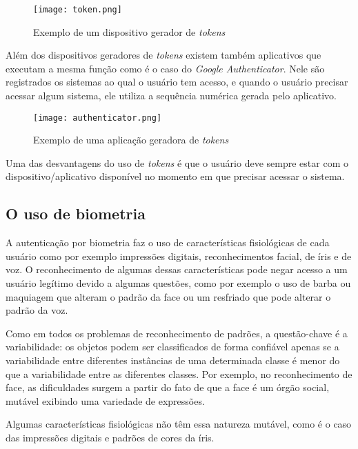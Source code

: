 \begin{figure}[!htb]
	\centering
	\texttt{[image: token.png]}
	\small
	\caption[Exemplo de um dispositivo gerador de \textit{tokens}]{Exemplo de um dispositivo gerador de \textit{tokens}}
	\label{fig:token}
\end{figure}

Além dos dispositivos geradores de \textit{tokens} existem também aplicativos que executam a mesma função como é o caso do \textit{Google Authenticator}. Nele são registrados os sistemas ao qual o usuário tem acesso, e quando o usuário precisar acessar algum sistema, ele utiliza a sequência numérica gerada pelo aplicativo.

\begin{figure}[!htb]
	\centering
	\texttt{[image: authenticator.png]}
	\small
	\caption[Exemplo de uma aplicação geradora de \textit{tokens}]{Exemplo de uma aplicação geradora de \textit{tokens}}
	\label{fig:token}
\end{figure}

Uma das desvantagens do uso de \textit{tokens} é que o usuário deve sempre estar com o dispositivo/aplicativo disponível no momento em que precisar acessar o sistema.

\subsection{O uso de biometria}
A autenticação por biometria faz o uso de características fisiológicas de cada usuário como por exemplo impressões digitais, reconhecimentos facial, de íris e de voz.
O reconhecimento de algumas dessas características pode negar acesso a um usuário legítimo devido a algumas questões, como por exemplo o uso de barba ou maquiagem que alteram o padrão da face ou um resfriado que pode alterar o padrão da voz.

\begin{citacao}
Como em todos os problemas de reconhecimento de padrões, a questão-chave é a variabilidade: os objetos podem ser classificados de forma confiável apenas se a variabilidade entre diferentes instâncias de uma determinada classe é menor do que a variabilidade entre as diferentes classes. Por exemplo, no reconhecimento de face, as dificuldades surgem a partir do fato de que a face é um órgão social, mutável exibindo uma variedade de expressões. \cite{Daugman2004}
\end{citacao}

Algumas características fisiológicas não têm essa natureza mutável, como é o caso das impressões digitais e padrões de cores da íris.

